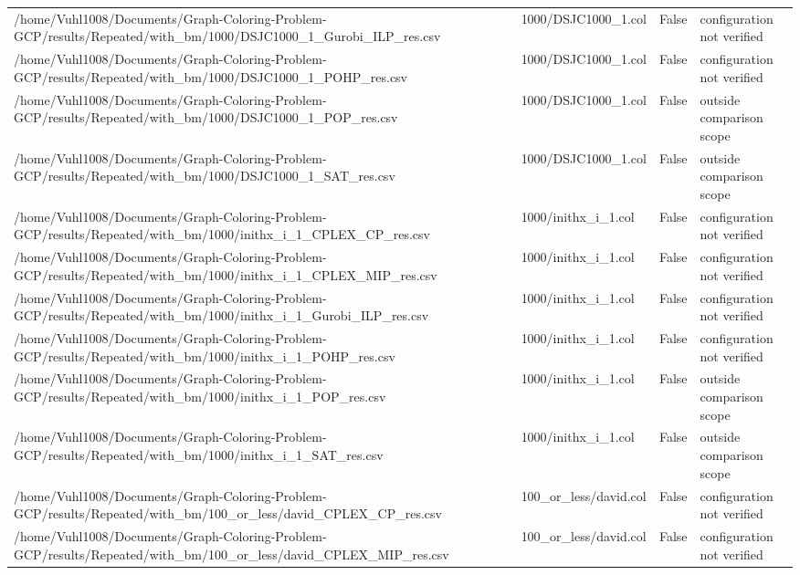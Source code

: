 \begin{table}[htbp]
\begin{tabular}{llll}
/home/Vuhl1008/Documents/Graph-Coloring-Problem-GCP/results/Repeated/with\_bm/1000/DSJC1000\_1\_Gurobi\_ILP\_res.csv & 1000/DSJC1000\_1.col & False & configuration not verified \\
/home/Vuhl1008/Documents/Graph-Coloring-Problem-GCP/results/Repeated/with\_bm/1000/DSJC1000\_1\_POHP\_res.csv & 1000/DSJC1000\_1.col & False & configuration not verified \\
/home/Vuhl1008/Documents/Graph-Coloring-Problem-GCP/results/Repeated/with\_bm/1000/DSJC1000\_1\_POP\_res.csv & 1000/DSJC1000\_1.col & False & outside comparison scope \\
/home/Vuhl1008/Documents/Graph-Coloring-Problem-GCP/results/Repeated/with\_bm/1000/DSJC1000\_1\_SAT\_res.csv & 1000/DSJC1000\_1.col & False & outside comparison scope \\
/home/Vuhl1008/Documents/Graph-Coloring-Problem-GCP/results/Repeated/with\_bm/1000/inithx\_i\_1\_CPLEX\_CP\_res.csv & 1000/inithx\_i\_1.col & False & configuration not verified \\
/home/Vuhl1008/Documents/Graph-Coloring-Problem-GCP/results/Repeated/with\_bm/1000/inithx\_i\_1\_CPLEX\_MIP\_res.csv & 1000/inithx\_i\_1.col & False & configuration not verified \\
/home/Vuhl1008/Documents/Graph-Coloring-Problem-GCP/results/Repeated/with\_bm/1000/inithx\_i\_1\_Gurobi\_ILP\_res.csv & 1000/inithx\_i\_1.col & False & configuration not verified \\
/home/Vuhl1008/Documents/Graph-Coloring-Problem-GCP/results/Repeated/with\_bm/1000/inithx\_i\_1\_POHP\_res.csv & 1000/inithx\_i\_1.col & False & configuration not verified \\
/home/Vuhl1008/Documents/Graph-Coloring-Problem-GCP/results/Repeated/with\_bm/1000/inithx\_i\_1\_POP\_res.csv & 1000/inithx\_i\_1.col & False & outside comparison scope \\
/home/Vuhl1008/Documents/Graph-Coloring-Problem-GCP/results/Repeated/with\_bm/1000/inithx\_i\_1\_SAT\_res.csv & 1000/inithx\_i\_1.col & False & outside comparison scope \\
/home/Vuhl1008/Documents/Graph-Coloring-Problem-GCP/results/Repeated/with\_bm/100\_or\_less/david\_CPLEX\_CP\_res.csv & 100\_or\_less/david.col & False & configuration not verified \\
/home/Vuhl1008/Documents/Graph-Coloring-Problem-GCP/results/Repeated/with\_bm/100\_or\_less/david\_CPLEX\_MIP\_res.csv & 100\_or\_less/david.col & False & configuration not verified \\

\end{tabular}
\end{table}
